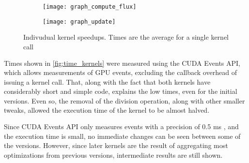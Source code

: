 \begin{figure}[!htp]
	\begin{subfigure}[b]{\columnwidth}
		\centering
		\texttt{[image: graph\_compute\_flux]}
		\caption{\computeflux}
		\label{fig:time_computeflux}
	\end{subfigure}
	\begin{subfigure}[b]{\columnwidth}
		\centering
		\texttt{[image: graph\_update]}
		\caption{\update}
		\label{fig:time_update}
	\end{subfigure}

	\caption{Indivudual kernel speedups. Times are the average for a single kernel call}
	\label{fig:time_kernles}
\end{figure}

Times shown in \cref{fig:time_kernels} were measured using the CUDA Events API, which allows measurements of GPU events, excluding the callback overhead of issuing a kernel call. That, along with the fact that both kernels have considerably short and simple code, explains the low times, even for the initial versions. Even so, the removal of the division operation, along with other smaller tweaks, allowed the execution time of the \update kernel to be almost halved.

Since CUDA Events API only measures events with a precision of 0.5 ms \cite{cuda_library_documentation}, and the execution time is small, no immediate changes can be seen between some of the versions. However, since later kernels are the result of aggregating most optimizations from previous versions, intermediate results are still shown.
